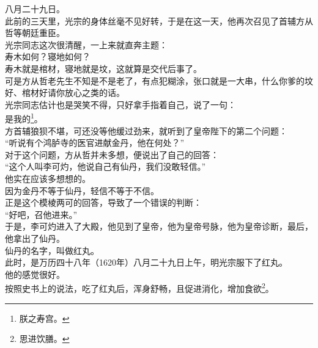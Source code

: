 \begin{multicols}{\theparacolNo}
八月二十九日。\\

此前的三天里，光宗的身体丝毫不见好转，于是在这一天，他再次召见了首辅方从哲等朝廷重臣。\\

光宗同志这次很清醒，一上来就直奔主题：\\

寿木如何？寝地如何？\\

寿木就是棺材，寝地就是坟，这就算是交代后事了。\\

可是方从哲老先生不知是不是老了，有点犯糊涂，张口就是一大串，什么你爹的坟好、棺材好请你放心之类的话。\\

光宗同志估计也是哭笑不得，只好拿手指着自己，说了一句：\\

是我的\footnote{朕之寿宫。}。\\

方首辅狼狈不堪，可还没等他缓过劲来，就听到了皇帝陛下的第二个问题：\\

“听说有个鸿胪寺的医官进献金丹，他在何处？”\\

对于这个问题，方从哲并未多想，便说出了自己的回答：\\

“这个人叫李可灼，他说自己有仙丹，我们没敢轻信。”\\

他实在应该多想想的。\\

因为金丹不等于仙丹，轻信不等于不信。\\

正是这个模棱两可的回答，导致了一个错误的判断：\\

“好吧，召他进来。”\\

于是，李可灼进入了大殿，他见到了皇帝，他为皇帝号脉，他为皇帝诊断，最后，他拿出了仙丹。\\

仙丹的名字，叫做红丸。\\

此时，是万历四十八年（1620年）八月二十九日上午，明光宗服下了红丸。\\

他的感觉很好。\\

按照史书上的说法，吃了红丸后，浑身舒畅，且促进消化，增加食欲\footnote{思进饮膳。}。\\


\end{multicols}
